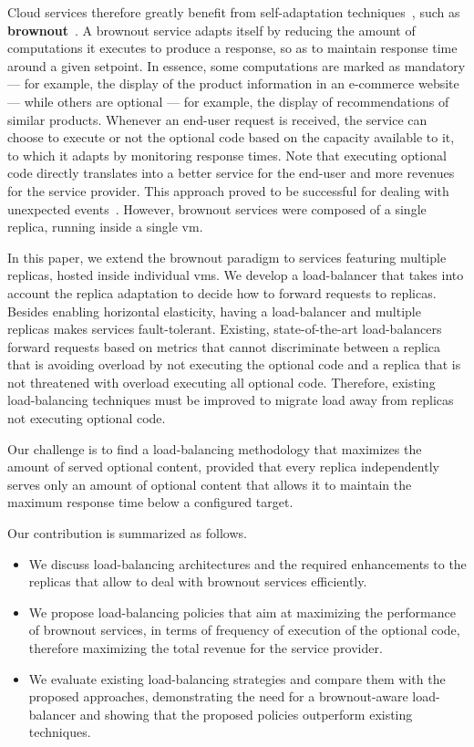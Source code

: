 Cloud services therefore greatly benefit from self-adaptation
techniques~\cite{SalehieSelfadaptive:TAAS}, such as {\bf
  brownout}~\citep{cloudish-tr}. A brownout service adapts itself by
reducing the amount of computations it executes to produce a response,
so as to maintain response time around a given setpoint.  In essence,
some computations are marked as mandatory --- for example, the display
of the product information in an e-commerce website --- while others
are optional --- for example, the display of recommendations of
similar products.  Whenever an end-user request is received, the
service can choose to execute or not the optional code based on the
capacity available to it, to which it adapts by monitoring response
times. Note that executing optional code directly translates into a
better service for the end-user and more revenues for the service
provider. This approach proved to be successful for dealing with
unexpected events~\citep{cloudish-tr}. However, brownout services were
composed of a single replica, running inside a single \ac{vm}.

In this paper, we extend the brownout paradigm to services featuring
multiple replicas, hosted inside individual \acp{vm}. We develop a
load-balancer that takes into account the replica adaptation to decide
how to forward requests to replicas.  Besides enabling horizontal
elasticity, having a load-balancer and multiple replicas makes
services fault-tolerant.
Existing, state-of-the-art load-balancers
forward requests based on metrics that cannot discriminate
between a replica that is avoiding overload by not executing the
optional code and a replica that is not threatened with overload
executing all optional code.
Therefore, existing load-balancing techniques must be improved to
migrate load away from replicas not executing optional code.

Our challenge is to find a load-balancing methodology that maximizes
the amount of served optional content, provided that every replica
independently serves only an amount of optional content that allows it
to maintain the maximum response time below a configured target.

Our contribution is summarized as follows.
\begin{itemize}
\item We discuss load-balancing architectures and the required
  enhancements to the replicas that allow to deal with brownout
  services efficiently.
\item We propose load-balancing policies that aim at maximizing the
  performance of brownout services, in terms of frequency of execution
  of the optional code, therefore maximizing the total revenue for the
  service provider.
\item We evaluate existing load-balancing strategies and compare them
  with the proposed approaches, demonstrating the need for a
  brownout-aware load-balancer and showing that the proposed policies
  outperform existing techniques.
\end{itemize}
